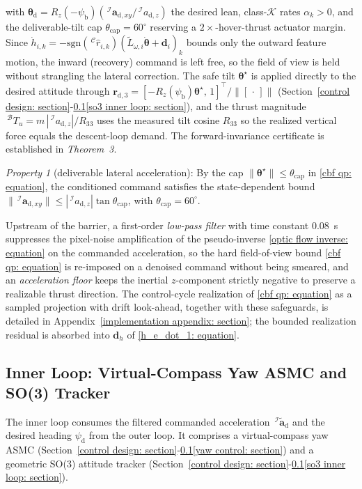 \documentclass{IEEEtaes}
\begin{document}
with $\boldsymbol{\theta}_\text{d}=R_z(-\psi_\text{b})(\,^\mathcal{I}\boldsymbol{a}_{\text{d},xy}/\,^\mathcal{I}a_{\text{d},z})$ the desired lean, class-$\mathcal{K}$ rates $\alpha_k>0$, and the deliverable-tilt cap $\theta_\text{cap}=60^\circ$ reserving a $2\times$-hover-thrust actuator margin. Since $\dot{h}_{i,k}=-\mathrm{sgn}(\,^\mathcal{C}\hat{r}_{i,k})(\tilde{L}_{\omega,i}\dot{\boldsymbol{\theta}}+\boldsymbol{d}_i)_k$ bounds only the outward feature motion, the inward (recovery) command is left free, so the field of view is held without strangling the lateral correction. The safe tilt $\boldsymbol{\theta}^\star$ is applied directly to the desired attitude through $\boldsymbol{r}_{\text{d},3}=[-R_z(\psi_\text{b})\boldsymbol{\theta}^\star,\,1]^\top/\|[\,\cdot\,]\|$ (Section~\ref{control design: section}-\ref{inner loop: section}\ref{so3 inner loop: section}), and the thrust magnitude $\,^\mathcal{B}T_u=m\,|\,^\mathcal{I}a_{\text{d},z}|/R_{33}$ uses the measured tilt cosine $R_{33}$ so the realized vertical force equals the descent-loop demand. The forward-invariance certificate is established in \textit{Theorem~3}.

\textit{Property 1} (deliverable lateral acceleration): By the cap $\|\boldsymbol{\theta}^\star\|\le\theta_\text{cap}$ in \eqref{cbf qp: equation}, the conditioned command satisfies the state-dependent bound $\|\,^\mathcal{I}\boldsymbol{a}_{\text{d},xy}\|\le|\,^\mathcal{I}a_{\text{d},z}|\tan\theta_\text{cap}$, with $\theta_\text{cap}=60^\circ$.

Upstream of the barrier, a first-order \emph{low-pass filter} with time constant $0.08$~s suppresses the pixel-noise amplification of the pseudo-inverse \eqref{optic flow inverse: equation} on the commanded acceleration, so the hard field-of-view bound \eqref{cbf qp: equation} is re-imposed on a denoised command without being smeared, and an \emph{acceleration floor} keeps the inertial $z$-component strictly negative to preserve a realizable thrust direction. The control-cycle realization of \eqref{cbf qp: equation} as a sampled projection with drift look-ahead, together with these safeguards, is detailed in Appendix~\ref{implementation appendix: section}; the bounded realization residual is absorbed into $\boldsymbol{d}_h$ of \eqref{h_e_dot_1: equation}.

\subsection{Inner Loop: Virtual-Compass Yaw ASMC and SO(3) Tracker} \label{inner loop: section}
The inner loop consumes the filtered commanded acceleration $\,^\mathcal{I}\tilde{\boldsymbol{a}}_\text{d}$ and the desired heading $\psi_\text{d}$ from the outer loop. It comprises a virtual-compass yaw ASMC (Section~\ref{control design: section}-\ref{inner loop: section}\ref{yaw control: section}) and a geometric SO(3) attitude tracker (Section~\ref{control design: section}-\ref{inner loop: section}\ref{so3 inner loop: section}).
\end{document}
